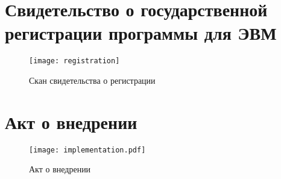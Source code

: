 \chapter{Свидетельство о государственной регистрации программы для ЭВМ}\label{ch:app1}
\begin{center}
    \begin{figure}[hb]
        \texttt{[image: registration]}
        \caption{Скан свидетельства о регистрации}\label{app:fig:registration}
    \end{figure}
\end{center}



\chapter{Акт о внедрении}\label{ch:app2}
\begin{center}
    \begin{figure}[hb]
        \texttt{[image: implementation.pdf]}
        \caption{Акт о внедрении}\label{app:fig:implementation}
    \end{figure}
\end{center}